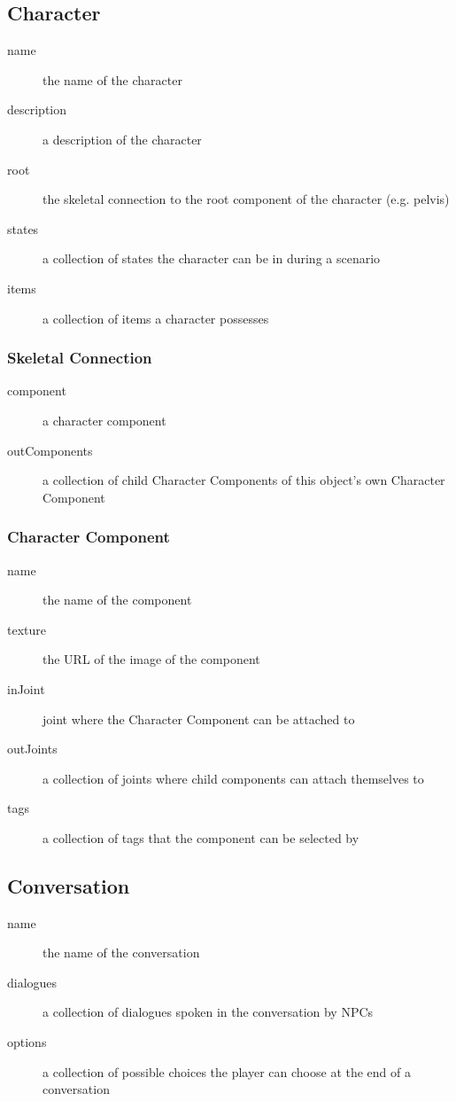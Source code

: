 \subsection{Character}
\begin{description}
\item[name]{the name of the character}
\item[description]{a description of the character}
\item[root]{the skeletal connection to the root component of the character (e.g. pelvis)}
\item[states]{a collection of states the character can be in during a scenario}
\item[items]{a collection of items a character possesses}
\end{description}

\subsubsection{Skeletal Connection}
\begin{description}
\item[component]{a character component}
\item[outComponents]{a collection of child Character Components of this object's own Character Component}
\end{description}

\subsubsection{Character Component}
\begin{description}
\item[name]{the name of the component}
\item[texture]{the URL of the image of the component}
\item[inJoint]{joint where the Character Component can be attached to}
\item[outJoints]{a collection of joints where child components can attach themselves to}
\item[tags]{a collection of tags that the component can be selected by}
\end{description}

\subsection{Conversation}
\begin{description}
\item[name]{the name of the conversation}
\item[dialogues]{a collection of dialogues spoken in the conversation by NPCs}
\item[options]{a collection of possible choices the player can choose at the end of a conversation}
\end{description}

